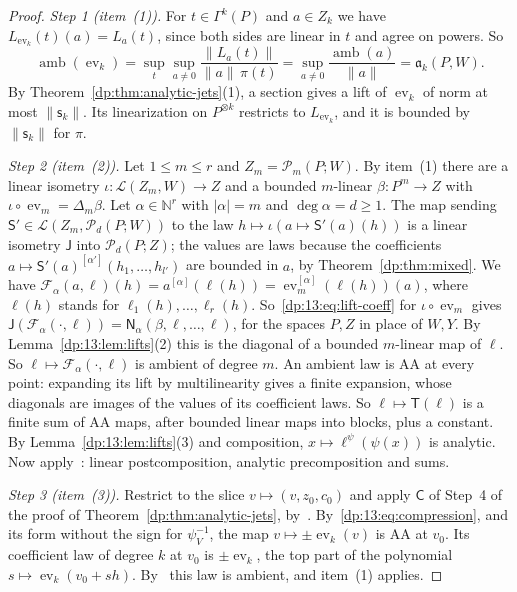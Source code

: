 \documentclass[11pt]{amsart}
\theoremstyle{definition}
\theoremstyle{remark}
\numberwithin{equation}{section}
\newcommand{\N}{\mathbb N}
\newcommand{\cL}{\mathcal L}
\newcommand{\abs}[1]{\lvert #1\rvert}
\newcommand{\norm}[1]{\lVert #1\rVert}
\theoremstyle{plain}
\theoremstyle{definition}
\theoremstyle{plain}
\newcommand{\ev}{\operatorname{ev}}
\newcommand{\cP}{\mathcal P}
\begin{document}
\begin{proof}
\emph{Step 1 (item~(1)).} For $t\in\Gamma^k(P)$ and $a\in Z_k$ we have $L_{\ev_k}(t)(a)=L_a(t)$, since both sides are linear in $t$ and agree on powers. So
\[
 \operatorname{amb}(\ev_k)=\sup_t\sup_{a\ne0}\frac{\norm{L_a(t)}}{\norm a\,\pi(t)}=\sup_{a\ne0}\frac{\operatorname{amb}(a)}{\norm a}=\mathfrak a_k(P,W).
\]
By Theorem~\ref{dp:thm:analytic-jets}(1), a section gives a lift of $\ev_k$ of norm at most $\norm{\mathsf s_k}$. Its linearization on $P^{\otimes k}$ restricts to $L_{\ev_k}$, and it is bounded by $\norm{\mathsf s_k}$ for $\pi$.

\emph{Step 2 (item~(2)).} Let $1\le m\le r$ and $Z_m=\cP_m(P;W)$. By item~(1) there are a linear isometry $\iota\colon\cL(Z_m,W)\to Z$ and a bounded $m$-linear $\beta\colon P^m\to Z$ with $\iota\circ\ev_m=\Delta_m\beta$. Let $\alpha\in\N^r$ with $\abs\alpha=m$ and $\deg\alpha=d\ge1$. The map sending $\mathsf S'\in\cL(Z_m,\cP_d(P;W))$ to the law $h\mapsto\iota(a\mapsto\mathsf S'(a)(h))$ is a linear isometry $\mathsf J$ into $\cP_d(P;Z)$; the values are laws because the coefficients $a\mapsto\mathsf S'(a)^{[\alpha']}(h_1,\dots,h_{l'})$ are bounded in $a$, by Theorem~\ref{dp:thm:mixed}. We have $\mathcal F_\alpha(a,\ell)(h)=a^{[\alpha]}(\ell(h))=\ev_m^{[\alpha]}(\ell(h))(a)$, where $\ell(h)$ stands for $\ell_1(h),\dots,\ell_r(h)$. So~\eqref{dp:13:eq:lift-coeff} for $\iota\circ\ev_m$ gives $\mathsf J(\mathcal F_\alpha({\cdot},\ell))=\mathsf N_\alpha(\beta,\ell,\dots,\ell)$, for the spaces $P,Z$ in place of $W,Y$. By Lemma~\ref{dp:13:lem:lifts}(2) this is the diagonal of a bounded $m$-linear map of $\ell$. So $\ell\mapsto\mathcal F_\alpha({\cdot},\ell)$ is ambient of degree $m$. An ambient law is AA at every point: expanding its lift by multilinearity gives a finite expansion, whose diagonals are images of the values of its coefficient laws. So $\ell\mapsto\mathsf T(\ell)$ is a finite sum of AA maps, after bounded linear maps into blocks, plus a constant. By Lemma~\ref{dp:13:lem:lifts}(3) and composition, $x\mapsto\ell^\psi(\psi(x))$ is analytic. Now apply~\cite[Proposition~14.12(1)]{I}: linear postcomposition, analytic precomposition and sums.

\emph{Step 3 (item~(3)).} Restrict to the slice $v\mapsto(v,z_0,c_0)$ and apply $\mathsf C$ of Step~4 of the proof of Theorem~\ref{dp:thm:analytic-jets}, by~\cite[Proposition~14.12(1)]{I}. By~\eqref{dp:13:eq:compression}, and its form without the sign for $\psi_V^{-1}$, the map $v\mapsto\pm\ev_k(v)$ is AA at $v_0$. Its coefficient law of degree $k$ at $v_0$ is $\pm\ev_k$, the top part of the polynomial $s\mapsto\ev_k(v_0+sh)$. By~\cite[Proposition~14.9(1)]{I} this law is ambient, and item~(1) applies.


\end{proof}
\end{document}
